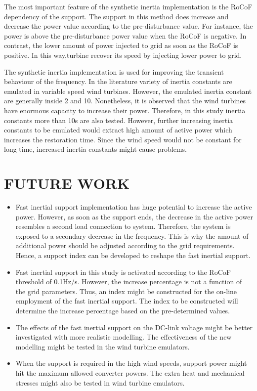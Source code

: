 The most important feature of the synthetic inertia implementation is the RoCoF dependency of the support. The support in this method does increase and decrease the power value according to the pre-disturbance value. For instance, the power is above the pre-disturbance power value when the RoCoF is negative. In contrast, the lower amount of power injected to grid as soon as the RoCoF is positive. In this way,turbine recover its speed by injecting lower power to grid.\par
The synthetic inertia implementation is used for improving the transient behaviour of the frequency. In the literature variety of inertia constants are emulated in variable speed wind turbines. However, the emulated inertia constant are generally inside 2 and 10. Nonetheless, it is observed that the wind turbines have enormous capacity to increase their power. Therefore, in this study inertia constants more than 10s are also tested. However, further increasing inertia constants to be emulated would extract high amount of active power which increases the restoration time. Since the wind speed would not be constant for long time, increased inertia constants might cause problems.\par 
\section{FUTURE WORK}
\begin{itemize}
	\item Fast inertial support implementation has huge potential to increase the active power. However, as soon as the support ends, the decrease in the active power resembles a second load connection to system. Therefore, the system is exposed to a secondary decrease in the frequency. This is why the amount of additional power should be adjusted according to the grid requirements. Hence, a support index can be developed to reshape the fast inertial support. 
	\item Fast inertial support in this study is activated according to the RoCoF threshold of 0.1Hz/s. However, the increase percentage is not a function of the grid parameters. Thus, an index might be constructed for the on-line employment of the fast inertial support. The index to be constructed will determine the increase percentage based on the pre-determined values. 
	\item The effects of the fast inertial support on the DC-link voltage might be better investigated with more realistic modelling. The effectiveness of the new modelling might be tested in the wind turbine emulators. 
	\item When the support is required in the high wind speeds, support power might hit the maximum allowed converter powers. The extra heat and mechanical stresses might also be tested in wind turbine emulators. 
\end{itemize}

